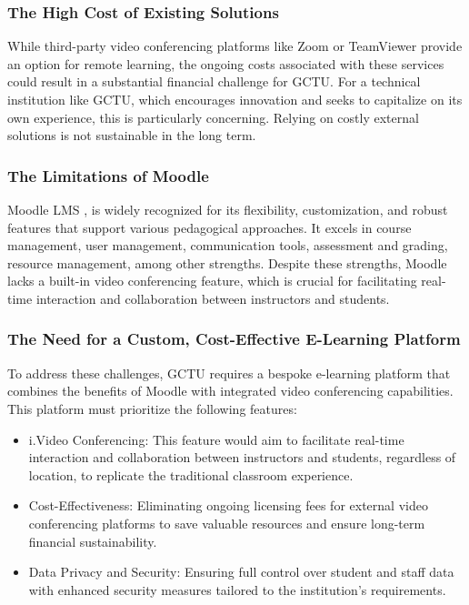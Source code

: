 \documentclass[a4paper,12pt]{article}  %
\begin{document}
\subsubsection{The High Cost of Existing Solutions}
While third-party video conferencing platforms like Zoom or TeamViewer provide
an option for remote learning, the ongoing costs associated with these services
could result in a substantial financial challenge for GCTU. For a technical
institution like GCTU, which encourages innovation and seeks to capitalize on
its own experience, this is particularly concerning. Relying on costly external
solutions is not sustainable in the long term.\\

\subsubsection{The Limitations of Moodle}
Moodle LMS \cite{moodle2024review}, is widely recognized for its flexibility,
customization, and robust features that support various pedagogical approaches.
It excels in course management, user management, communication tools,
assessment and grading, resource management, among other strengths. Despite
these strengths, Moodle lacks a built-in video conferencing feature, which is
crucial for facilitating real-time interaction and collaboration between
instructors and students.\\

\subsubsection{The Need for a Custom, Cost-Effective E-Learning Platform}
To address these challenges, GCTU requires a bespoke e-learning platform that
combines the benefits of Moodle with integrated video conferencing
capabilities. This platform must prioritize the following features:\\

\begin{itemize}
      \item i.Video Conferencing: This feature would aim to facilitate real-time
            interaction and collaboration between instructors and students, regardless of
            location, to replicate the traditional classroom experience.\\
      \item Cost-Effectiveness: Eliminating ongoing licensing fees for external video
            conferencing platforms to save valuable resources and ensure long-term
            financial sustainability.\\
      \item Data Privacy and Security: Ensuring full control over student and staff data
            with enhanced security measures tailored to the institution's requirements.\\
\end{itemize}
\end{document}
